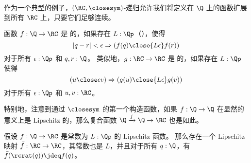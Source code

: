 作为一个典型的例子，$(\RC,\closesym)$-递归允许我们将定义在 $\Q$ 上的函数扩展到所有 $\RC$ 上，只要它们足够连续。
%

\begin{defn}\label{defn:lipschitz}
函数 $f:\Q\to\RC$ 是 
%
%
%
%
的，如果存在 $L:\Qp$（），使得
\[ |q - r|<\epsilon \Rightarrow (f(q) \close{L\epsilon} f(r)) \]
对于所有 $\epsilon:\Qp$ 和 $q,r:\Q$。
%
类似地，$g:\RC\to\RC$ 是  的，如果存在 $L:\Qp$ 使得
\[ (u\close\epsilon v) \Rightarrow (g(u) \close{L\epsilon} g(v)) \]
对于所有 $\epsilon:\Qp$ 和 $u,v:\RC$。
\end{defn}

特别地，注意到通过 $\closesym$ 的第一个构造函数，如果 $f:\Q\to\Q$ 在显然的意义上是 Lipschitz 的，那么复合函数 $\Q\xrightarrow{f} \Q \to \RC$ 也是如此。

\begin{lem}\label{RC-extend-Q-Lipschitz}
假设 $f : \Q \to \RC$ 是常数为 $L : \Qp$ 的 Lipschitz 函数。
那么存在一个 Lipschitz 映射 $\bar{f} : \RC \to \RC$，其常数也是 $L$，并且对于所有 $q:\Q$，有 $\bar{f}(\rcrat(q)) \jdeq f(q)$。
\end{lem}

